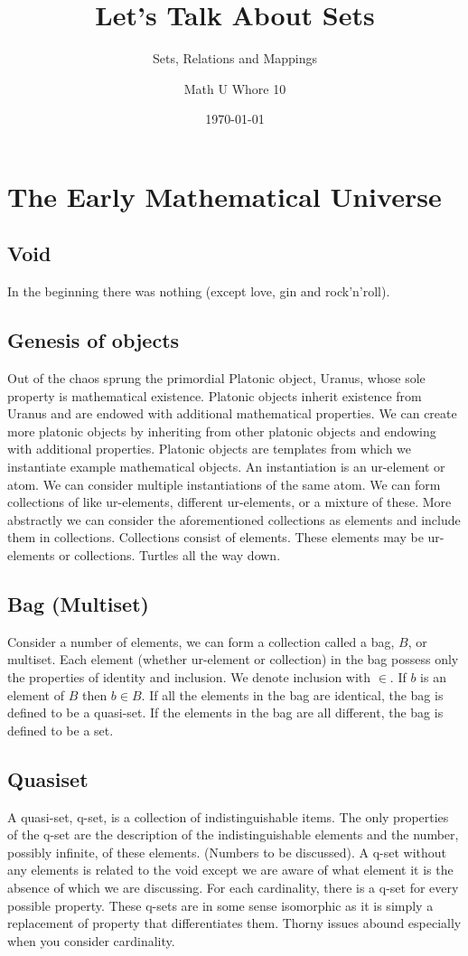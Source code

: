\documentclass[a4paper]{scrartcl}
\title{Let's Talk About Sets}
\subtitle{Sets, Relations and Mappings}
\author{Math U Whore 10}
\date{\today}
\begin{document}
\maketitle

\section{The Early Mathematical Universe}
\subsection{Void}
In the beginning there was nothing (except love, gin and rock'n'roll).
\subsection{Genesis of objects} 
Out of the chaos sprung the primordial Platonic object, Uranus, whose sole property is mathematical existence. Platonic objects inherit existence from Uranus and are endowed with additional mathematical properties. We can create more platonic objects by inheriting from other platonic objects and endowing with additional properties. Platonic objects are templates from which we instantiate example mathematical objects. An instantiation is an ur-element or atom. We can consider multiple instantiations of the same atom. We can form collections of like ur-elements, different ur-elements, or a mixture of these. More abstractly we can consider the aforementioned collections as elements and include them in collections.
Collections consist of elements. These elements may be ur-elements or collections. Turtles all the way down. 

\subsection{Bag (Multiset)}
Consider a number of elements, we can form a collection called a bag, $B$, or multiset. Each element (whether ur-element or collection) in the bag possess only the properties of identity and inclusion. We denote inclusion with $\in$. If $b$ is an element of $B$ then $b\in B$. If all the elements in the bag are identical, the bag is defined to be a quasi-set. If the elements in the bag are all different, the bag is defined to be a set.\\
\subsection{Quasiset} 
A quasi-set, q-set, is a collection of indistinguishable items. The only properties of the q-set are the description of the indistinguishable elements and the number, possibly infinite, of these elements. (Numbers to be discussed). A q-set without any elements is related to the void except we are aware of what element it is the absence of which we are discussing. For each cardinality, there is a q-set for every possible property. These q-sets are in some sense isomorphic as it is simply a replacement of property that differentiates them. Thorny issues abound especially when you consider cardinality.
\end{document}
